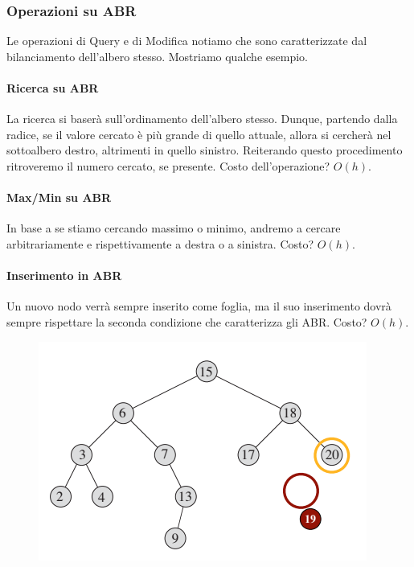 \documentclass{article}
\begin{document}
\subsubsection{Operazioni su ABR} Le operazioni di Query e di Modifica notiamo che sono caratterizzate dal bilanciamento dell'albero stesso. Mostriamo qualche esempio.

\paragraph{Ricerca su ABR} La ricerca si baserà sull'ordinamento dell'albero stesso. Dunque, partendo dalla radice, se il valore cercato è più grande di quello attuale, allora si cercherà nel sottoalbero destro, altrimenti in quello sinistro. Reiterando questo procedimento ritroveremo il numero cercato, se presente. Costo dell'operazione? $O(h)$.

\newpage

\paragraph{Max/Min su ABR} In base a se stiamo cercando massimo o minimo, andremo a cercare arbitrariamente e rispettivamente a destra o a sinistra. Costo? $O(h)$.

\paragraph{Inserimento in ABR} Un nuovo nodo verrà sempre inserito come foglia, ma il suo inserimento dovrà sempre rispettare la seconda condizione che caratterizza gli ABR. Costo? $O(h)$.

\begin{figure}[htbp]
        \center
        \includegraphics[scale=0.75]{img/inserimentoABR.png}
    \end{figure}
\end{document}
